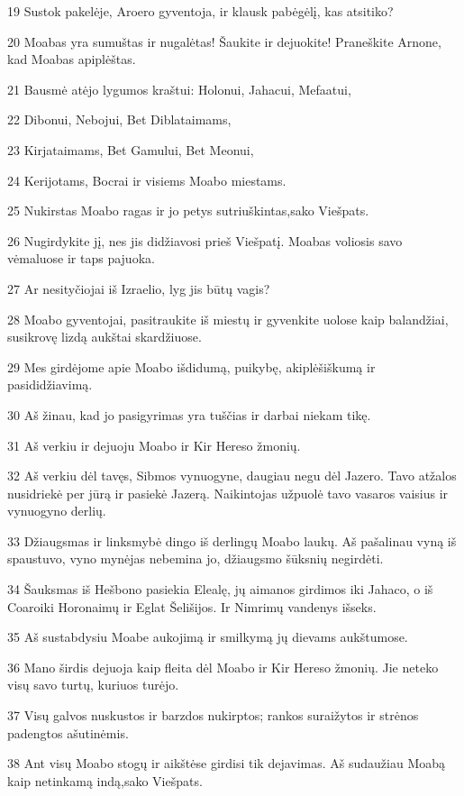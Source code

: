 \par 19 Sustok pakelėje, Aroero gyventoja, ir klausk pabėgėlį, kas atsitiko? 
\par 20 Moabas yra sumuštas ir nugalėtas! Šaukite ir dejuokite! Praneškite Arnone, kad Moabas apiplėštas. 
\par 21 Bausmė atėjo lygumos kraštui: Holonui, Jahacui, Mefaatui, 
\par 22 Dibonui, Nebojui, Bet Diblataimams, 
\par 23 Kirjataimams, Bet Gamului, Bet Meonui, 
\par 24 Kerijotams, Bocrai ir visiems Moabo miestams. 
\par 25 Nukirstas Moabo ragas ir jo petys sutriuškintas,­sako Viešpats.­ 
\par 26 Nugirdykite jį, nes jis didžiavosi prieš Viešpatį. Moabas voliosis savo vėmaluose ir taps pajuoka. 
\par 27 Ar nesityčiojai iš Izraelio, lyg jis būtų vagis? 
\par 28 Moabo gyventojai, pasitraukite iš miestų ir gyvenkite uolose kaip balandžiai, susikrovę lizdą aukštai skardžiuose. 
\par 29 Mes girdėjome apie Moabo išdidumą, puikybę, akiplėšiškumą ir pasididžiavimą. 
\par 30 Aš žinau, kad jo pasigyrimas yra tuščias ir darbai niekam tikę. 
\par 31 Aš verkiu ir dejuoju Moabo ir Kir Hereso žmonių. 
\par 32 Aš verkiu dėl tavęs, Sibmos vynuogyne, daugiau negu dėl Jazero. Tavo atžalos nusidriekė per jūrą ir pasiekė Jazerą. Naikintojas užpuolė tavo vasaros vaisius ir vynuogyno derlių. 
\par 33 Džiaugsmas ir linksmybė dingo iš derlingų Moabo laukų. Aš pašalinau vyną iš spaustuvo, vyno mynėjas nebemina jo, džiaugsmo šūksnių negirdėti. 
\par 34 Šauksmas iš Hešbono pasiekia Elealę, jų aimanos girdimos iki Jahaco, o iš Coaro­iki Horonaimų ir Eglat Šelišijos. Ir Nimrimų vandenys išseks. 
\par 35 Aš sustabdysiu Moabe aukojimą ir smilkymą jų dievams aukštumose. 
\par 36 Mano širdis dejuoja kaip fleita dėl Moabo ir Kir Hereso žmonių. Jie neteko visų savo turtų, kuriuos turėjo. 
\par 37 Visų galvos nuskustos ir barzdos nukirptos; rankos suraižytos ir strėnos padengtos ašutinėmis. 
\par 38 Ant visų Moabo stogų ir aikštėse girdisi tik dejavimas. Aš sudaužiau Moabą kaip netinkamą indą,­sako Viešpats.­ 
